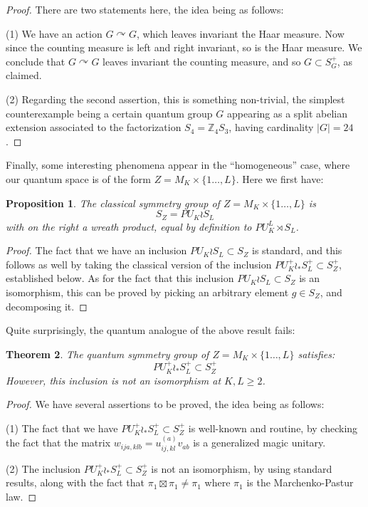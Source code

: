 \documentclass[12pt]{amsbook}
\newtheorem{theorem}{Theorem}[chapter]
\newtheorem{proposition}[theorem]{Proposition}
\begin{document}
\begin{proof}
There are two statements here, the idea being as follows:

\medskip

(1) We have an action $G\curvearrowright G$, which leaves invariant the Haar measure. Now since the counting measure is left and right invariant, so is the Haar measure. We conclude that $G\curvearrowright G$ leaves invariant the counting measure, and so $G\subset S_G^+$, as claimed.

\medskip

(2) Regarding the second assertion, this is something non-trivial, the simplest counterexample being a certain quantum group $G$ appearing as a split abelian extension associated to the factorization $S_4=\mathbb Z_4S_3$, having cardinality $|G|=24$. 
\end{proof}

Finally, some interesting phenomena appear in the ``homogeneous'' case, where our quantum space is of the form $Z=M_K\times \{1\ldots,L\}$. Here we first have:

\begin{proposition}
The classical symmetry group of $Z=M_K\times \{1\ldots,L\}$ is
$$S_Z=PU_K\wr S_L$$
with on the right a wreath product, equal by definition to $PU_K^L\rtimes S_L$.
\end{proposition}

\begin{proof}
The fact that we have an inclusion $PU_K\wr S_L\subset S_Z$ is standard, and this follows as well by taking the classical version of the inclusion $PU_K^+\wr_*S_L^+\subset S_Z^+$, established below. As for the fact that this inclusion $PU_K\wr S_L\subset S_Z$ is an isomorphism, this can be proved by picking an arbitrary element $g\in S_Z$, and decomposing it.
\end{proof}

Quite surprisingly, the quantum analogue of the above result fails:

\begin{theorem}
The quantum symmetry group of $Z=M_K\times \{1\ldots,L\}$ satisfies:
$$PU_K^+\wr_*S_L^+\subset S_Z^+$$
However, this inclusion is not an isomorphism at $K,L\geq2$.
\end{theorem}

\begin{proof}
We have several assertions to be proved, the idea being as follows:

\medskip

(1) The fact that we have $PU_K^+\wr_*S_L^+\subset S_Z^+$ is well-known and routine, by checking the fact that the matrix $w_{ija,klb}=u_{ij,kl}^{(a)}v_{ab}$ is a generalized magic unitary.

\medskip

(2) The inclusion $PU_K^+\wr_*S_L^+\subset S_Z^+$ is not an isomorphism, by using standard results, along with the fact that $\pi_1\boxtimes\pi_1\neq\pi_1$ where $\pi_1$ is the Marchenko-Pastur law.
\end{proof}
\end{document}
